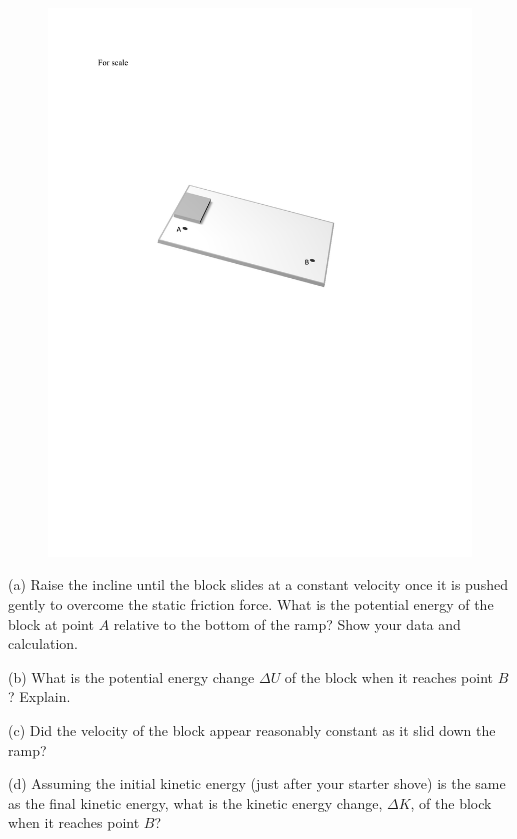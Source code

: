 \begin{figure}

\hspace{\fill}\includegraphics[scale=0.7]{conservative/block_and_ramp.pdf}
\end{figure}

(a) Raise the incline until the block slides at a constant velocity once it
is pushed gently to overcome the static friction force. What is the potential
energy of the block at point $A$ relative to the bottom of the ramp? Show your
data and calculation.
\answerspace{35mm}


(b) What is the potential energy change $\Delta U$ of the block when it reaches point $B$? Explain.
\answerspace{20mm}

(c) Did the velocity of the block appear reasonably constant as it slid down the ramp?
\answerspace{15mm}

\pagebreak
(d) Assuming the initial kinetic energy (just after your starter shove) is the
same as the final kinetic energy, what is the kinetic energy change, $\Delta K$, of the block when it reaches point $B$? 
\answerspace{10mm}

